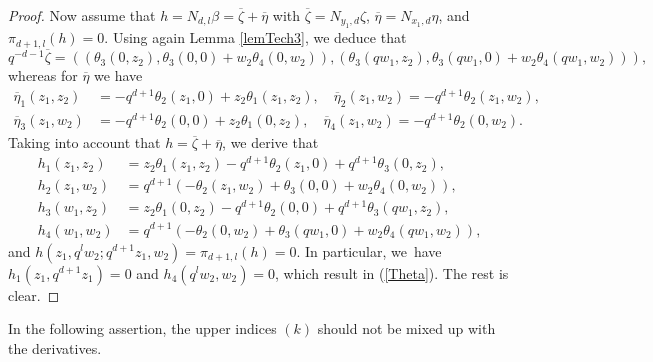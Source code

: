 \documentclass[12pt,reqno]{amsart}%
\theoremstyle{plain}
\numberwithin{theorem}{section} \numberwithin{equation}{section}
\numberwithin{lemma}{section}
\numberwithin{remark}{section}
\numberwithin{example}{section}
\numberwithin{proposition}{section}
\numberwithin{definition}{section}
\numberwithin{corollary}{section}
\begin{document}
\begin{proof}
Now assume that $h=N_{d,l}\beta=\overline{\zeta}+\overline{\eta}$ with
$\overline{\zeta}=N_{y_{1},d}\zeta$, $\overline{\eta}=N_{x_{1},d}\eta$, and
$\pi_{d+1,l}\left(  h\right)  =0$. Using again Lemma \ref{lemTech3}, we deduce
that%
\[
q^{-d-1}\overline{\zeta}=\left(  \left(  \theta_{3}\left(  0,z_{2}\right)
,\theta_{3}\left(  0,0\right)  +w_{2}\theta_{4}\left(  0,w_{2}\right)
\right)  ,\left(  \theta_{3}\left(  qw_{1},z_{2}\right)  ,\theta_{3}\left(
qw_{1},0\right)  +w_{2}\theta_{4}\left(  qw_{1},w_{2}\right)  \right)
\right)  ,
\]
whereas for $\overline{\eta}$ we have
\begin{align*}
\overline{\eta}_{1}\left(  z_{1},z_{2}\right)   &  =-q^{d+1}\theta_{2}\left(
z_{1},0\right)  +z_{2}\theta_{1}\left(  z_{1},z_{2}\right)  ,\quad
\overline{\eta}_{2}\left(  z_{1},w_{2}\right)  =-q^{d+1}\theta_{2}\left(
z_{1},w_{2}\right)  ,\\
\overline{\eta}_{3}\left(  z_{1},w_{2}\right)   &  =-q^{d+1}\theta_{2}\left(
0,0\right)  +z_{2}\theta_{1}\left(  0,z_{2}\right)  ,\quad\overline{\eta}%
_{4}\left(  z_{1},w_{2}\right)  =-q^{d+1}\theta_{2}\left(  0,w_{2}\right)  .
\end{align*}
Taking into account that $h=\overline{\zeta}+\overline{\eta}$, we derive that
\begin{align*}
h_{1}\left(  z_{1},z_{2}\right)   &  =z_{2}\theta_{1}\left(  z_{1}%
,z_{2}\right)  -q^{d+1}\theta_{2}\left(  z_{1},0\right)  +q^{d+1}\theta
_{3}\left(  0,z_{2}\right)  ,\\
h_{2}\left(  z_{1},w_{2}\right)   &  =q^{d+1}\left(  -\theta_{2}\left(
z_{1},w_{2}\right)  +\theta_{3}\left(  0,0\right)  +w_{2}\theta_{4}\left(
0,w_{2}\right)  \right)  ,\\
h_{3}\left(  w_{1},z_{2}\right)   &  =z_{2}\theta_{1}\left(  0,z_{2}\right)
-q^{d+1}\theta_{2}\left(  0,0\right)  +q^{d+1}\theta_{3}\left(  qw_{1}%
,z_{2}\right)  ,\\
h_{4}\left(  w_{1},w_{2}\right)   &  =q^{d+1}\left(  -\theta_{2}\left(
0,w_{2}\right)  +\theta_{3}\left(  qw_{1},0\right)  +w_{2}\theta_{4}\left(
qw_{1},w_{2}\right)  \right)  ,
\end{align*}
and $h\left(  z_{1},q^{l}w_{2};q^{d+1}z_{1},w_{2}\right)  =\pi_{d+1,l}\left(
h\right)  =0$. In particular, we\ have $h_{1}\left(  z_{1},q^{d+1}%
z_{1}\right)  =0$ and $h_{4}\left(  q^{l}w_{2},w_{2}\right)  =0$, which result
in (\ref{Theta}). The rest is clear.
\end{proof}

In the following assertion, the upper indices $\left(  k\right)  $ should not
be mixed up with the derivatives.
\end{document}
